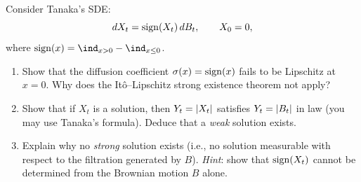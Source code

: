\begin{exercise}
Consider Tanaka's SDE:
\[
  dX_t = \mathrm{sign}(X_t)\,dB_t, \qquad X_0 = 0,
\]
where $\sign(x) = \ind_{x > 0} - \ind_{x \leq 0}$.
\begin{enumerate}
  \item Show that the diffusion coefficient $\sigma(x) = \mathrm{sign}(x)$ fails
        to be Lipschitz at $x = 0$. Why does the It\^o--Lipschitz strong
        existence theorem not apply?
  \item Show that if $X_t$ is a solution, then $Y_t = \left| X_t \right|$
        satisfies $Y_t = \left| B_t \right|$ in law (you may use Tanaka's formula).
        Deduce that a \emph{weak} solution exists.
  \item Explain why no \emph{strong} solution exists (i.e., no solution
        measurable with respect to the filtration generated by $B$).
        \emph{Hint}: show that $\mathrm{sign}(X_t)$ cannot be determined from the
        Brownian motion $B$ alone.
\end{enumerate}
\end{exercise}
